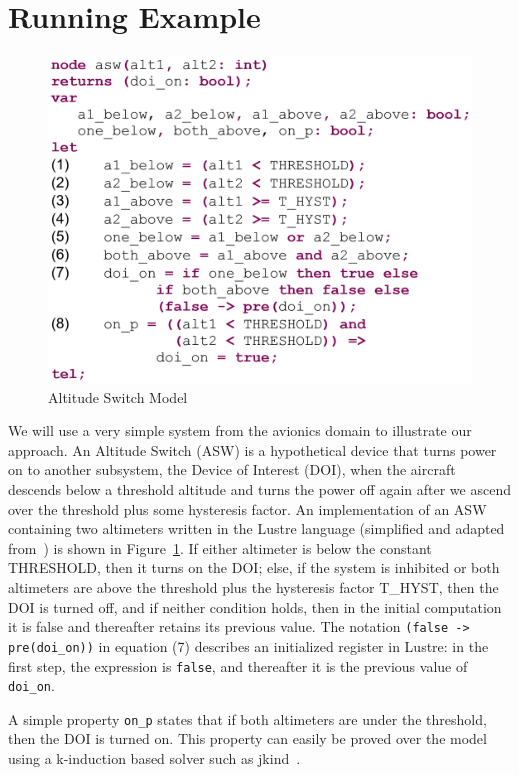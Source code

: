 \section{Running Example}
\label{sec:example}


\begin{figure}[t]
\centering
\includegraphics[width=0.6\columnwidth]{figs/aswcode.png}
\caption{Altitude Switch Model }
\label{fig:asw}
\end{figure}

We will use a very simple system from the avionics domain to illustrate our approach. An Altitude Switch (ASW) is a hypothetical device that turns power on to another subsystem, the Device of Interest (DOI), when the aircraft descends below a threshold altitude and turns the power off again after we ascend over the threshold plus some hysteresis factor.  An implementation of an ASW containing two altimeters written in the Lustre language (simplified and adapted from~\cite{HCW02:ase-deviation}) is shown in Figure~\ref{fig:asw}.  If either altimeter is below the constant THRESHOLD, then it turns on the DOI; else, if the system is inhibited or both altimeters are above the threshold plus the hysteresis factor T\_HYST, then the DOI is turned off, and if neither condition holds, then in the initial computation it is false and thereafter retains its previous value.  The notation \texttt{(false -> pre(doi\_on))} in equation (7) describes an initialized register in Lustre: in the first step, the expression is \texttt{false}, and thereafter it is the previous value of \texttt{doi\_on}.

A simple property \texttt{on\_p} states that if both altimeters are under the threshold, then the DOI is turned on.  This property can easily be proved over the model using a k-induction based solver such as jkind~\cite{jkind}.



